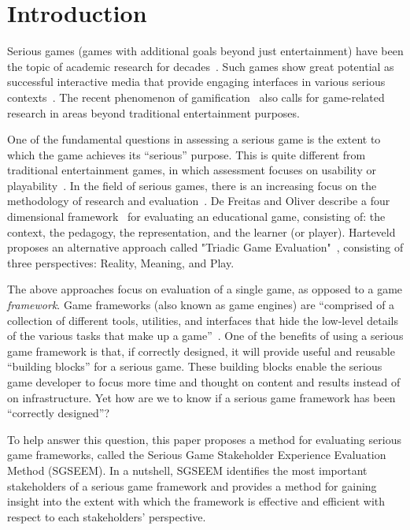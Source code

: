 \documentclass{sigchi}
\begin{document}

\section{Introduction}

Serious games (games with additional goals beyond just entertainment) have been the topic
of academic research for decades~\cite{Zyda2005}. Such games show great potential as
successful interactive media that provide engaging interfaces in various serious
contexts~\cite{mcgonigal2011reality,reeves2009total}. The recent phenomenon of
gamification~\cite{Deterding2011mt} also calls for game-related research in areas beyond
traditional entertainment purposes.

One of the fundamental questions in assessing a serious game is the extent to which the
game achieves its ``serious'' purpose.  This is quite different from 
traditional entertainment games, in which assessment focuses on usability or
playability~\cite{song2007new}. In the field of serious games, there is an increasing
focus on the methodology of research and evaluation~\cite{Mayer2012233}. De Freitas and
Oliver describe a four dimensional framework~\cite{de2006can} for evaluating an
educational game, consisting of: the context, the pedagogy, the representation, and the
learner (or player). Harteveld proposes an alternative approach called "Triadic Game
Evaluation"~\cite{harteveld2010triadic}, consisting of three perspectives: Reality,
Meaning, and Play.

The above approaches focus on evaluation of a single game, as opposed to a game {\em
  framework}. Game frameworks (also known as game engines) are ``comprised of a collection
of different tools, utilities, and interfaces that hide the low-level details of the
various tasks that make up a game''~\cite{sherrod2006ultimate}. One of the benefits of
using a serious game framework is that, if correctly designed, it will provide useful and
reusable ``building blocks'' for a serious game.  These building blocks enable the serious
game developer to focus more time and thought on content and results instead of on
infrastructure.  Yet how are we to know if a serious game framework has been ``correctly designed''?

To help answer this question, this paper proposes a method for evaluating serious game
frameworks, called the Serious Game Stakeholder Experience Evaluation Method (SGSEEM). In
a nutshell, SGSEEM identifies the most important stakeholders of a serious game framework
and provides a method for gaining insight into the extent with which the framework is
effective and efficient with respect to each stakeholders' perspective.
\end{document}
